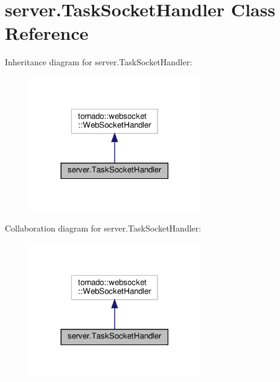 \hypertarget{classserver_1_1TaskSocketHandler}{}\section{server.\+Task\+Socket\+Handler Class Reference}
\label{classserver_1_1TaskSocketHandler}


Inheritance diagram for server.\+Task\+Socket\+Handler\+:
\nopagebreak
\begin{figure}[H]
\begin{center}
\leavevmode
\includegraphics[width=213pt]{classserver_1_1TaskSocketHandler__inherit__graph}
\end{center}
\end{figure}


Collaboration diagram for server.\+Task\+Socket\+Handler\+:
\nopagebreak
\begin{figure}[H]
\begin{center}
\leavevmode
\includegraphics[width=213pt]{classserver_1_1TaskSocketHandler__coll__graph}
\end{center}
\end{figure}
